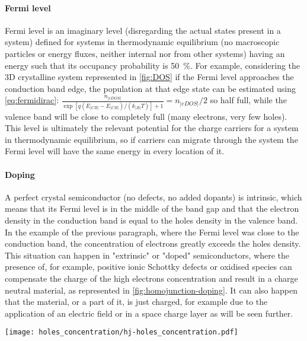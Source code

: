		\paragraph{Fermi level}
		Fermi level is an imaginary level (disregarding the actual states present in a system) defined for systems in thermodynamic equilibrium (no macroscopic particles or energy fluxes, neither internal nor from other systems) having an energy such that its occupancy probability is \SI{50}{\%}.
		For example, considering the 3D crystalline system represented in \cref{fig:DOS} if the Fermi level approaches the conduction band edge, the population at that edge state can be estimated using \cref{eq:fermidirac}: $\frac{n_|eDOS|}{\exp[q(E_|CB|-E_|CB|)/(k_|B|T)]+1} = n_|eDOS|/2$ so half full, while the valence band will be close to completely full (many electrons, very few holes).
		This level is ultimately the relevant potential for the charge carriers for a system in thermodynamic equilibrium, so if carriers can migrate through the system the Fermi level will have the same energy in every location of it.
		
		\paragraph{Doping}
		A perfect crystal semiconductor (no defects, no added dopants) is intrinsic, which means that its Fermi level is in the middle of the band gap and that the electron density in the conduction band is equal to the holes density in the valence band.
		In the example of the previous paragraph, where the Fermi level was close to the conduction band, the concentration of electrons greatly exceeds the holes density.
		This situation can happen in "extrinsic" or "doped" semiconductors, where the presence of, for example, positive ionic Schottky defects or oxidised species can compensate the charge of the high electrons concentration and result in a charge neutral material, as represented in \cref{fig:homojunction-doping}.
		It can also happen that the material, or a part of it, is just charged, for example due to the application of an electric field or in a space charge layer as will be seen further.
		
		\begin{SCfigure}
			\centering
			\texttt{[image: holes\_concentration/hj-holes\_concentration.pdf]}
			\label{fig:holes_concentration}
		\end{SCfigure}
	

